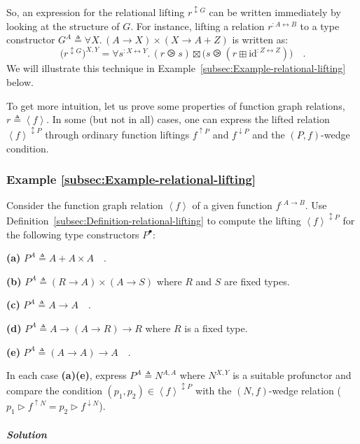 So, an expression for the relational lifting $r^{\updownarrow G}$
can be written immediately by looking at the structure of $G$. For
instance, lifting a relation $r^{:A\leftrightarrow B}$ to a type
constructor $G^{A}\triangleq\forall X.\,\left(A\rightarrow X\right)\times\left(X\rightarrow A+Z\right)$
is written as:
\[
\big(r^{\updownarrow G}\big)^{X,Y}=\forall s^{:X\leftrightarrow Y}.\,(r\ogreaterthan s)\boxtimes\big(s\ogreaterthan(r\boxplus\text{id}^{:Z\leftrightarrow Z})\big)\quad.
\]
 We will illustrate this technique in Example~\ref{subsec:Example-relational-lifting}
below.

To get more intuition, let us prove some properties of function graph
relations, $r\triangleq\left<f\right>$. In some (but not in all)
cases, one can express the lifted relation $\left<f\right>^{\updownarrow P}$
through ordinary function liftings $f^{\uparrow P}$ and $f^{\downarrow P}$
and the $\left(P,f\right)$-wedge condition.

\subsubsection{Example \label{subsec:Example-relational-lifting}\ref{subsec:Example-relational-lifting}}

Consider the function graph relation $\left<f\right>$ of a given
function $f^{:A\rightarrow B}$. Use Definition~\ref{subsec:Definition-relational-lifting}
to compute the lifting $\left<f\right>^{\updownarrow P}$ for the
following type constructors $P^{\bullet}$:

\textbf{(a)} $P^{A}\triangleq A+A\times A\quad$.

\textbf{(b)} $P^{A}\triangleq(R\rightarrow A)\times(A\rightarrow S)$
where $R$ and $S$ are fixed types.

\textbf{(c)} $P^{A}\triangleq A\rightarrow A\quad$.

\textbf{(d)} $P^{A}\triangleq A\rightarrow\left(A\rightarrow R\right)\rightarrow R$
where $R$ is a fixed type.

\textbf{(e)} $P^{A}\triangleq\left(A\rightarrow A\right)\rightarrow A\quad$.

In each case \textbf{(a)}\textendash \textbf{(e)}, express $P^{A}\triangleq N^{A,A}$
where $N^{X,Y}$ is a suitable profunctor and compare the condition
$(p_{1},p_{2})\in\left<f\right>^{\updownarrow P}$ with the $\left(N,f\right)$-wedge
relation ($p_{1}\triangleright f^{\uparrow N}=p_{2}\triangleright f^{\downarrow N}$). 

\subparagraph{Solution}

